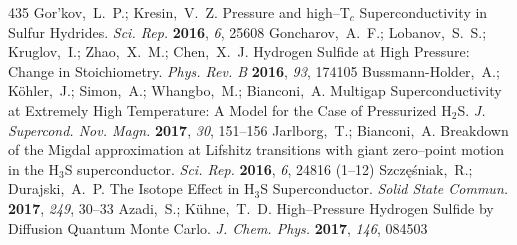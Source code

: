 \documentclass[12pt,letterpaper,oneside]{article}
\begin{document}
\begin{mcitethebibliography}{435}
Gor'kov,~L.~P.; Kresin,~V.~Z. Pressure and high--T$_c$ Superconductivity in
  Sulfur Hydrides. \emph{Sci. Rep.} \textbf{2016}, \emph{6}, 25608\relax
\mciteBstWouldAddEndPuncttrue
\mciteSetBstMidEndSepPunct{\mcitedefaultmidpunct}
{\mcitedefaultendpunct}{\mcitedefaultseppunct}\relax
\EndOfBibitem
{}
Goncharov,~A.~F.; Lobanov,~S.~S.; Kruglov,~I.; Zhao,~X.~M.; Chen,~X.~J.
    Hydrogen Sulfide at High Pressure: Change in Stoichiometry.
  \emph{Phys. Rev. B} \textbf{2016}, \emph{93}, 174105\relax
\mciteBstWouldAddEndPuncttrue
\mciteSetBstMidEndSepPunct{\mcitedefaultmidpunct}
{\mcitedefaultendpunct}{\mcitedefaultseppunct}\relax
\EndOfBibitem
{}
Bussmann-Holder,~A.; K{\"o}hler,~J.; Simon,~A.; Whangbo,~M.; Bianconi,~A.
  Multigap Superconductivity at Extremely High Temperature: A Model for the
  Case of Pressurized H$_2$S. \emph{J. Supercond. Nov. Magn.} \textbf{2017},
  \emph{30}, 151--156\relax
\mciteBstWouldAddEndPuncttrue
\mciteSetBstMidEndSepPunct{\mcitedefaultmidpunct}
{\mcitedefaultendpunct}{\mcitedefaultseppunct}\relax
\EndOfBibitem
{}
Jarlborg,~T.; Bianconi,~A. Breakdown of the Migdal approximation at Lifshitz
  transitions with giant zero--point motion in the H$_3$S superconductor.
  \emph{Sci. Rep.} \textbf{2016}, \emph{6}, 24816 (1--12)\relax
\mciteBstWouldAddEndPuncttrue
\mciteSetBstMidEndSepPunct{\mcitedefaultmidpunct}
{\mcitedefaultendpunct}{\mcitedefaultseppunct}\relax
\EndOfBibitem
{}
Szcz{\k e}{\'s}niak,~R.; Durajski,~A.~P. The Isotope Effect in H$_3$S
  Superconductor. \emph{Solid State Commun.} \textbf{2017}, \emph{249},
  30--33\relax
\mciteBstWouldAddEndPuncttrue
\mciteSetBstMidEndSepPunct{\mcitedefaultmidpunct}
{\mcitedefaultendpunct}{\mcitedefaultseppunct}\relax
\EndOfBibitem
{}
Azadi,~S.; K{\"u}hne,~T.~D. High--Pressure Hydrogen Sulfide by Diffusion
  Quantum Monte Carlo. \emph{J. Chem. Phys.} \textbf{2017}, \emph{146},
  084503\relax
\mciteBstWouldAddEndPuncttrue
\mciteSetBstMidEndSepPunct{\mcitedefaultmidpunct}
{\mcitedefaultendpunct}{\mcitedefaultseppunct}\relax
\EndOfBibitem

\end{mcitethebibliography}
\end{document}
